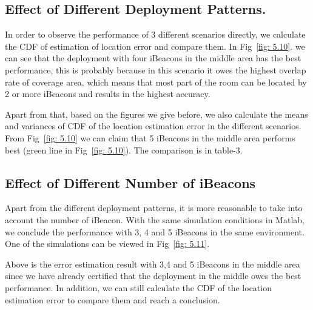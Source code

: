 \documentclass[12pt]{report}
\begin{document}
\subsection{Effect of Different Deployment Patterns.}
In order to observe the performance of 3 different scenarios directly, we calculate the CDF of estimation of location error and compare them. In Fig~\ref{fig: 5.10}. we can see that the deployment with four iBeacons in the middle area has the best performance, this is probably because in this scenario it owes the highest overlap rate of coverage area, which means that most part of the room can be located by 2 or more iBeacons and results in the highest accuracy.

Apart from that, based on the figures we give before, we also calculate the means and variances of CDF of the location estimation error in the different scenarios. From Fig~\ref{fig: 5.10} we can claim that 5 iBeacons in the middle area performs best (green line in Fig~\ref{fig: 5.10}). The comparison is in table-3.

\subsection{Effect of Different Number of iBeacons}
Apart from the different deployment patterns, it is more reasonable to take into account the number of iBeacon. With the same simulation conditions in Matlab, we conclude the performance with 3, 4 and 5 iBeacons in the same environment. One of the simulations can be viewed in Fig~\ref{fig: 5.11}.

Above is the error estimation result with 3,4 and 5 iBeacons in the middle area since we have already certified that the deployment in the middle owes the best performance. In addition, we can still calculate the CDF of the location estimation error to compare them and reach a conclusion. 
\end{document}
